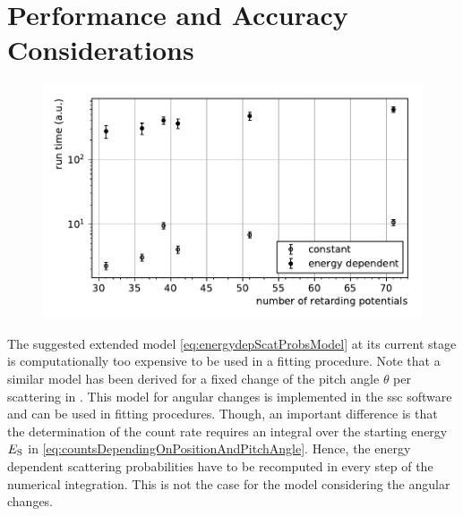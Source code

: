 \section{Performance and Accuracy Considerations}
\begin{figure}[th]
    \centering
    \includegraphics[width=\textwidth]{chapter/energyDependentCrossSec/fig/scatCrossSecRunTime.pdf}
    \label{fig:scatCrossSecRunTimes}
\end{figure}
The suggested extended model \eqref{eq:energydepScatProbsModel} at its current stage is computationally too expensive to be used in a fitting procedure. Note that a similar model has been derived for a fixed change of the pitch angle $\theta$ per scattering in \cite{Groh2015}. This model for angular changes is implemented in the \gls{ssc} software and can be used in fitting procedures. Though, an important difference is that the determination of the count rate requires an integral over the starting energy $E_\mathrm{S}$ in \eqref{eq:countsDependingOnPositionAndPitchAngle}. Hence, the energy dependent scattering probabilities have to be recomputed in every step of the numerical integration. This is not the case for the model considering the angular changes.

